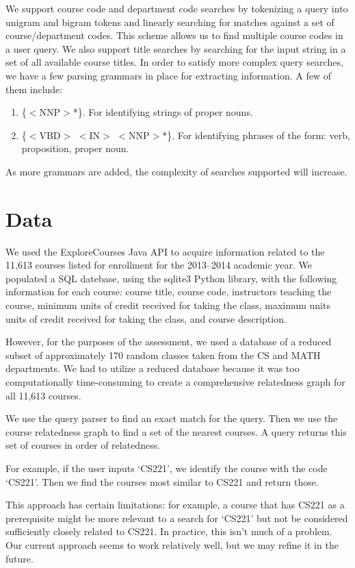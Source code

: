 \documentclass[12pt]{article}
\begin{document}
We support course code and department code searches by tokenizing a
query into unigram and bigram tokens and linearly searching for
matches against a set of course/department codes. This scheme allows
us to find multiple course codes in a user query. We also support
title searches by searching for the input string in a set of all
available course titles. In order to satisfy more complex query
searches, we have a few parsing grammars in place for extracting
information. A few of them include:
\begin{enumerate}
	\item \{$<$NNP$>$*\}. For identifying strings of proper nouns.

	\item \{$<$VBD$>$ $<$IN$>$ $<$NNP$>$*\}. For identifying phrases of the form: verb, proposition, proper noun.
\end{enumerate}

As more grammars are added, the complexity of searches supported will increase.


\section*{Data}
We used the ExploreCourses Java API to acquire information related to
the 11,613 courses listed for enrollment for the 2013–2014 academic
year. We populated a SQL datebase, using the sqlite3 Python library,
with the following information for each course: course title, course
code, instructors teaching the course, minimum units of credit
received for taking the class, maximum units units of credit received
for taking the class, and course description.

However, for the purposes of the assessment, we used a database of a
reduced subset of approximately 170 random classes taken from the CS
and MATH departments. We had to utilize a reduced database because it
was too computationally time-consuming to create a comprehensive relatedness graph for
all 11,613 courses.

We use the query parser to find an exact match for the query. Then we
use the course relatedness graph to find a set of the nearest
courses. A query returns this set of courses in order of relatedness.

For example, if the user inputs `CS221', we identify the course with
the code `CS221'. Then we find the courses most similar to CS221 and
return those.

This approach has certain limitations: for example, a course that has
CS221 as a prerequisite might be more relevant to a search for `CS221'
but not be considered sufficiently closely related to CS221. In
practice, this isn't much of a problem. Our current approach seems to
work relatively well, but we may refine it in the future.
\end{document}

